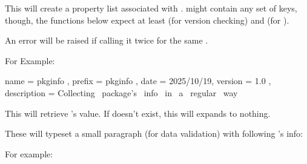 \documentclass[10pt]{article}
\begin{document}
\begin{codedescribe}{\PkgSet}
\begin{codesyntax}%
\end{codesyntax}
This will create a property list associated with .  might contain any set of keys, though, the functions below expect at least  (for version checking) and  (for \tsobj{\PkgDescription}).
\end{codedescribe}
\begin{tsremark}
  An error will be raised if calling it twice for the same .
\end{tsremark}
For Example:
\begin{codestore}[demoB]
  { 
    name         = {pkginfo} ,
    prefix       = {pkginfo} ,
    date         = {2025/10/19},
    version      = {1.0} ,
    description  = {Collecting~ package's~ info~ in~ a~ regular~ way}
  }
\end{codestore}


\begin{codedescribe}{\PkgInfo}
\begin{codesyntax}%
\end{codesyntax}
This will retrieve 's value. If  doesn't exist, this will expands to nothing.
\end{codedescribe}


\begin{codedescribe}{\PkgDescription}
\begin{codesyntax}%
\end{codesyntax}
These will typeset a small paragraph (for data validation) with following 's info: 
\end{codedescribe}
For example:
\begin{codestore}[demoC]
\end{codestore}

\end{document}
